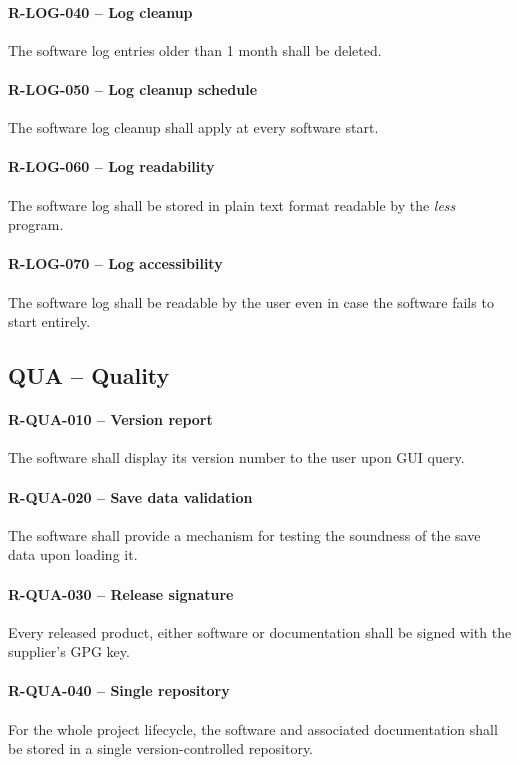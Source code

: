 \paragraph{R-LOG-040 -- Log cleanup}
The software log entries older than 1 month shall be deleted.

\paragraph{R-LOG-050 -- Log cleanup schedule}
The software log cleanup shall apply at every software start.

\paragraph{R-LOG-060 -- Log readability}
The software log shall be stored in plain text format readable
by the \emph{less} program.

\paragraph{R-LOG-070 -- Log accessibility}
The software log shall be readable by the user even in case the software
fails to start entirely.

\subsection{QUA -- Quality}
\paragraph{R-QUA-010 -- Version report}
The software shall display its version number to the user upon GUI query.

\paragraph{R-QUA-020 -- Save data validation}
The software shall provide a mechanism for testing the soundness of the
save data upon loading it.

\paragraph{R-QUA-030 -- Release signature}
Every released product, either software or documentation shall be signed
with the supplier's GPG key.

\paragraph{R-QUA-040 -- Single repository}
For the whole project lifecycle, the software and associated documentation shall
be stored in a single version-controlled repository.

